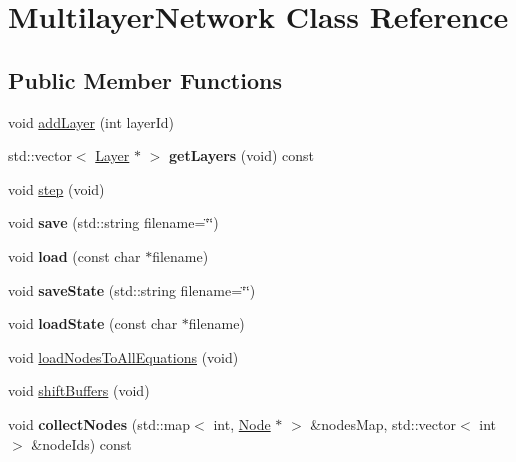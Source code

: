 \hypertarget{classMultilayerNetwork}{}\section{Multilayer\+Network Class Reference}
\label{classMultilayerNetwork}
\subsection*{Public Member Functions}
\begin{DoxyCompactItemize}
\item 
void \hyperlink{classMultilayerNetwork_a229198446718a0bf87d872ea04f5308a}{add\+Layer} (int layer\+Id)
\item 
std\+::vector$<$ \hyperlink{classLayer}{Layer} $\ast$ $>$ {\bfseries get\+Layers} (void) const \hypertarget{classMultilayerNetwork_ad4ec3500f8c0b436ba738dcd5b533ba6}{}\label{classMultilayerNetwork_ad4ec3500f8c0b436ba738dcd5b533ba6}

\item 
void \hyperlink{classMultilayerNetwork_a8b52de3dbb17a23b7c86708ad53ba161}{step} (void)
\item 
void {\bfseries save} (std\+::string filename=\char`\"{}\char`\"{})\hypertarget{classMultilayerNetwork_a153e708be575c327a9c450ceed402c02}{}\label{classMultilayerNetwork_a153e708be575c327a9c450ceed402c02}

\item 
void {\bfseries load} (const char $\ast$filename)\hypertarget{classMultilayerNetwork_a6649a568665867114ddebe7b4b0726f7}{}\label{classMultilayerNetwork_a6649a568665867114ddebe7b4b0726f7}

\item 
void {\bfseries save\+State} (std\+::string filename=\char`\"{}\char`\"{})\hypertarget{classMultilayerNetwork_a4723e9478fe2a78bcf35a540869d66a4}{}\label{classMultilayerNetwork_a4723e9478fe2a78bcf35a540869d66a4}

\item 
void {\bfseries load\+State} (const char $\ast$filename)\hypertarget{classMultilayerNetwork_a2536024138714e0ddc51bb4b1ae79395}{}\label{classMultilayerNetwork_a2536024138714e0ddc51bb4b1ae79395}

\item 
void \hyperlink{classMultilayerNetwork_ab21e50242eea4221aab415e5b2a5a326}{load\+Nodes\+To\+All\+Equations} (void)
\item 
void \hyperlink{classMultilayerNetwork_a1d00f683f9d07fc715b8c2e4786884c8}{shift\+Buffers} (void)
\item 
void {\bfseries collect\+Nodes} (std\+::map$<$ int, \hyperlink{classNode}{Node} $\ast$ $>$ \&nodes\+Map, std\+::vector$<$ int $>$ \&node\+Ids) const \hypertarget{classMultilayerNetwork_a336346cc9479828006fed64ce4f204e8}{}\label{classMultilayerNetwork_a336346cc9479828006fed64ce4f204e8}


\end{DoxyCompactItemize}
